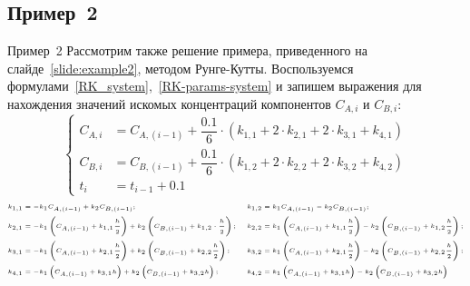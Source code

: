 \documentclass[aspectratio=169, mathserif]{beamer}	%
\begin{document}
\subsection{Пример~2}
\begin{frame}[fragile, ]{Пример~2}
\scriptsize
Рассмотрим также решение примера, приведенного на слайде~\ref{slide:example2}, методом Рунге-Кутты.
Воспользуемся формулами~\eqref{RK_system},~\eqref{RK-params-system} и запишем выражения для нахождения значений искомых концентраций компонентов $C_{A,i}$ и $C_{B,i}$:
\vfill
\begin{equation*}
	\left\{
	\begin{aligned}
		C_{A,i} &= C_{A,(i-1)} + \dfrac{0.1}{6} \cdot \left(k_{1,1} + 2\cdot k_{2,1} + 2 \cdot k_{3,1} + k_{4,1}\right) \\
		C_{B,i} &= C_{B,(i-1)} + \dfrac{0.1}{6} \cdot \left(k_{1,2} + 2\cdot k_{2,2} + 2 \cdot k_{3,2} + k_{4,2}\right) \\
		t_{i} &= t_{i-1} + 0.1
	\end{aligned}
	\right.
\end{equation*}
\vfill
\begin{equation*}
	\begin{tiny}
		\begin{aligned}
			k_{1,1} &= -k_1  C_{A,(i-1)} + k_2  C_{B,(i-1)}; &
			k_{1,2} &= k_1  C_{A,(i-1)} - k_2  C_{B,(i-1)}; \\
			k_{2,1} &= -k_1  \left(C_{A,(i-1)} + k_{1,1}  \dfrac{h}{2}\right) + k_2  \left(C_{B,(i-1)}+ k_{1,2} \cdot \dfrac{h}{2}\right); &
			k_{2,2} &= k_1 \left(C_{A,(i-1)} + k_{1,1} \dfrac{h}{2}\right) - k_2 \left(C_{B,(i-1)}+ k_{1,2}  \dfrac{h}{2}\right); \\
			k_{3,1} &= -k_1  \left(C_{A,(i-1)} + k_{2,1}  \dfrac{h}{2}\right) + k_2  \left(C_{B,(i-1)}+ k_{2,2}  \dfrac{h}{2}\right); &
			k_{3,2} &= k_1  \left(C_{A,(i-1)} + k_{2,1}  \dfrac{h}{2}\right) - k_2  \left(C_{B,(i-1)}+ k_{2,2}  \dfrac{h}{2}\right); \\
			k_{4,1} &= -k_1  \left(C_{A,(i-1)} + k_{3,1}  h\right) + k_2  \left(C_{B,(i-1)}+ k_{3,2}  h\right); &
			k_{4,2} &= k_1  \left(C_{A,(i-1)} + k_{3,1}  h\right) - k_2  \left(C_{B,(i-1)}+ k_{3,2}  h\right) \\
		\end{aligned}
	\end{tiny}
\end{equation*}
\vfill
\end{frame}
\end{document}
